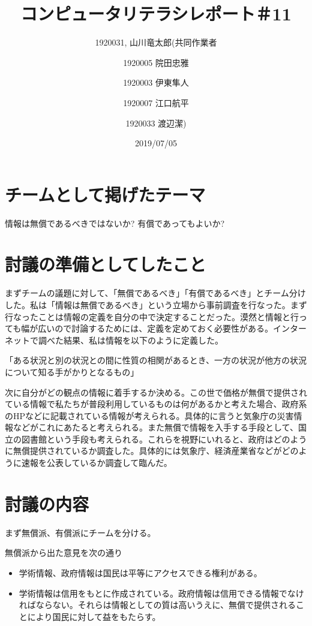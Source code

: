 \documentclass[12pt,a4j]{jarticle}
\begin{document}
\title{コンピュータリテラシレポート＃11}
\author{1920031, 山川竜太郎(共同作業者  \and 1920005 院田忠雅 \and 1920003 伊東隼人 \and 1920007 江口航平 \and 1920033 渡辺潔)}
\date{2019/07/05}
\maketitle

\section{チームとして掲げたテーマ}
情報は無償であるべきではないか? 有償であってもよいか?

\section{討議の準備としてしたこと}
まずチームの議題に対して、「無償であるべき」「有償であるべき」とチーム分けした。私は「情報は無償であるべき」という立場から事前調査を行なった。まず行なったことは情報の定義を自分の中で決定することだった。漠然と情報と行っても幅が広いので討論するためには、定義を定めておく必要性がある。インターネットで調べた結果、私は情報を以下のように定義した。

「ある状況と別の状況との間に性質の相関があるとき、一方の状況が他方の状況について知る手がかりとなるもの」

次に自分がどの観点の情報に着手するか決める。この世で価格が無償で提供されている情報で私たちが普段利用しているものは何があるかと考えた場合、政府系のHPなどに記載されている情報が考えられる。具体的に言うと気象庁の災害情報などがこれにあたると考えられる。また無償で情報を入手する手段として、国立の図書館という手段も考えられる。これらを視野にいれると、政府はどのように無償提供されているか調査した。具体的には気象庁、経済産業省などがどのように速報を公表しているか調査して臨んだ。

\section{討議の内容}
まず無償派、有償派にチームを分ける。

無償派から出た意見を次の通り

\begin{itemize}
\item 学術情報、政府情報は国民は平等にアクセスできる権利がある。
\item 学術情報は信用をもとに作成されている。政府情報は信用できる情報でなければならない。それらは情報としての質は高いうえに、無償で提供されることにより国民に対して益をもたらす。
\end{itemize}
\end{document}
